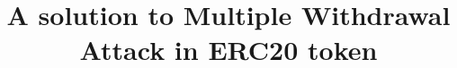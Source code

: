 \documentclass[compsoc, conference, a4paper, 10pt, times]{IEEEtran}
\begin{document}
\title{A solution to Multiple Withdrawal Attack in ERC20 token}
\author{
	\IEEEauthorblockN{                  }
	\IEEEauthorblockA{                  }
}

\maketitle
\IEEEpubidadjcol

\IEEEpeerreviewmaketitle






\footnotesize

\end{document}
